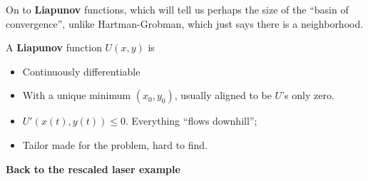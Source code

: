 \documentclass[11pt, oneside]{article}   	%
\begin{document}
On to \textbf{Liapunov} functions, which will tell us perhaps the size of the ``basin of convergence'', unlike Hartman-Grobman, which just says there is a neighborhood.

A \textbf{Liapunov} function $U(x,y)$ is 

\begin{itemize}
\item Continuously differentiable
\item With a unique minimum $(x_0, y_0)$, usually aligned to be $U$'s only zero.
\item $U'(x(t), y(t)) \leq 0$.  Everything ``flows downhill''; 
\item Tailor made for the problem, hard to find.
\end{itemize}


\textbf{Back to the rescaled laser example}
\end{document}
